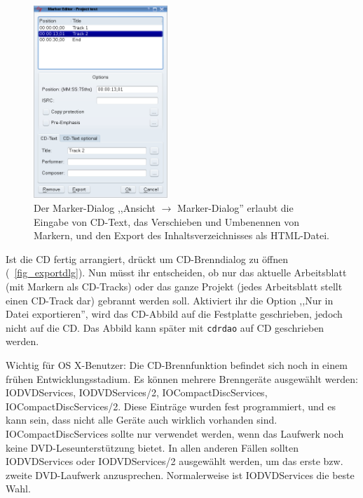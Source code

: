 \begin{figure}[ht]
 \centering\includegraphics[width=0.45\textwidth]{../images/marker-editor}
 \caption{Der Marker-Dialog ,,Ansicht $\rightarrow$ Marker-Dialog'' erlaubt die Eingabe von CD-Text, das Verschieben und Umbenennen von Markern, und den Export des Inhaltsverzeichnisses als HTML-Datei.}
 \label{fig_marker-editor}
\end{figure}

Ist die CD fertig arrangiert, drückt  um CD-Brenndialog zu öffnen (\FigB~\ref{fig_exportdlg}). Nun müsst ihr entscheiden, ob nur das aktuelle Arbeitsblatt (mit Markern als CD-Tracks) oder das ganze Projekt (jedes Arbeitsblatt stellt einen CD-Track dar) gebrannt werden soll. Aktiviert ihr die Option ,,Nur in Datei exportieren'', wird das CD-Abbild auf die Festplatte geschrieben, jedoch nicht auf die CD. Das Abbild kann später mit \texttt{cdrdao} auf CD geschrieben werden.

Wichtig für OS X-Benutzer: Die CD-Brennfunktion befindet sich noch in einem frühen Entwicklungsstadium. Es können mehrere Brenngeräte ausgewählt werden: IODVDServices, IODVDServices/2, IOCompactDiscServices, IOCompactDiscServices/2. Diese Einträge wurden fest programmiert, und es kann sein, dass nicht alle Geräte auch wirklich vorhanden sind. IOCompactDiscServices sollte nur verwendet werden, wenn das Laufwerk noch keine DVD-Leseunterstützung bietet. In allen anderen Fällen sollten IODVDServices oder IODVDServices/2 ausgewählt werden, um das erste bzw. zweite DVD-Laufwerk anzusprechen. Normalerweise ist IODVDServices die beste Wahl.

